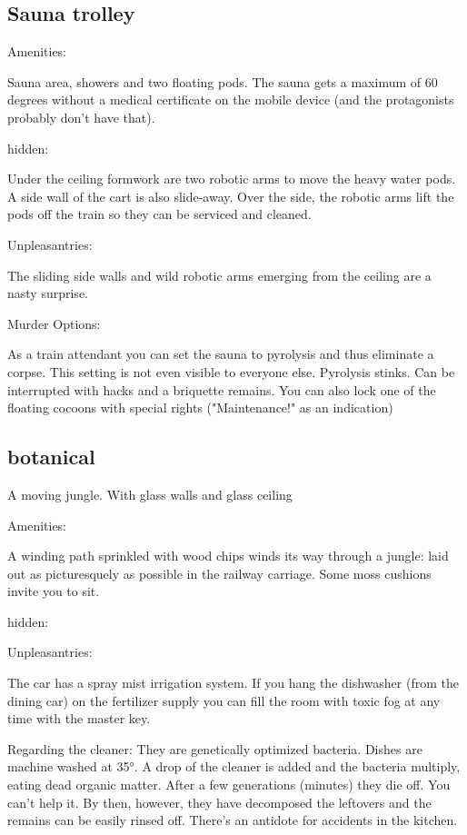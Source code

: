 \documentclass{book}
\begin{document}
\subsection{Sauna trolley}


Amenities:

Sauna area, showers and two floating pods. The sauna gets a maximum of 60 degrees without a medical certificate on the mobile device (and the protagonists probably don't have that).

hidden:

Under the ceiling formwork are two robotic arms to move the heavy water pods. A side wall of the cart is also slide-away. Over the side, the robotic arms lift the pods off the train so they can be serviced and cleaned.

Unpleasantries:

The sliding side walls and wild robotic arms emerging from the ceiling are a nasty surprise.

Murder Options:

As a train attendant you can set the sauna to pyrolysis and thus eliminate a corpse. This setting is not even visible to everyone else.
Pyrolysis stinks. Can be interrupted with hacks and a briquette remains.
You can also lock one of the floating cocoons with special rights ("Maintenance!" as an indication)

\subsection{botanical}

A moving jungle. With glass walls and glass ceiling

Amenities:

A winding path sprinkled with wood chips winds its way through a jungle: laid out as picturesquely as possible in the railway carriage. Some moss cushions invite you to sit.

hidden:

Unpleasantries:

The car has a spray mist irrigation system. If you hang the dishwasher (from the dining car) on the fertilizer supply you can fill the room with toxic fog at any time with the master key.

Regarding the cleaner: They are genetically optimized bacteria. Dishes are machine washed at 35°. A drop of the cleaner is added and the bacteria multiply, eating dead organic matter. After a few generations (minutes) they die off. You can't help it. By then, however, they have decomposed the leftovers and the remains can be easily rinsed off.
There's an antidote for accidents in the kitchen.
\end{document}
